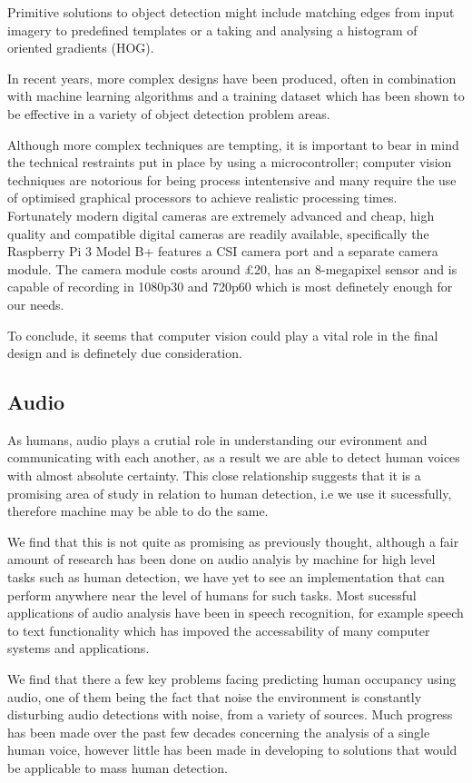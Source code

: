 \documentclass{l4proj}
\begin{document}
Primitive solutions to object detection might include matching edges from input imagery to predefined templates or a taking and analysing a histogram of oriented gradients (HOG)\cite{c-hog}. 

In recent years, more complex designs have been produced, often in combination with machine learning algorithms and a training dataset which has been shown to be effective in a variety of object detection problem areas. 

Although more complex techniques are tempting, it is important to bear in mind the technical restraints put in place by using a microcontroller; computer vision techniques are notorious for being process intentensive and many require the use of optimised graphical processors to achieve realistic processing times. Fortunately modern digital cameras are extremely advanced and cheap, high quality and compatible digital cameras are readily available, specifically the Raspberry Pi 3 Model B+ features a CSI camera port and a separate camera module. The camera module costs around £20, has an 8-megapixel sensor and is capable of recording in 1080p30 and 720p60\cite{c-picamera} which is most definetely enough for our needs.

To conclude, it seems that computer vision could play a vital role in the final design and is definetely due consideration.

\subsection{Audio}

As humans, audio plays a crutial role in understanding our evironment and communicating with each another, as a result we are able to detect human voices with almost absolute certainty. This close relationship suggests that it is a promising area of study in relation to human detection, i.e we use it sucessfully, therefore machine may be able to do the same. 

We find that this is not quite as promising as previously thought, although a fair amount of research has been done on audio analyis by machine for high level tasks such as human detection, we have yet to see an implementation that can perform anywhere near the level of humans for such tasks. Most sucessful applications of audio analysis have been in speech recognition, for example speech to text functionality which has impoved the accessability of many computer systems and applications\cite{c-speech}.

We find that there a few key problems facing predicting human occupancy using audio, one of them being the fact that noise the environment is constantly disturbing audio detections with noise, from a variety of sources. Much progress has been made over the past few decades concerning the analysis of a single human voice, however little has been made in developing to solutions that would be applicable to mass human detection.
\end{document}
